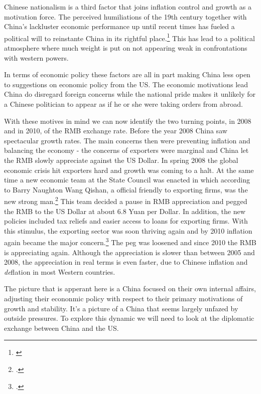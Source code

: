 Chinese nationalism is a third factor that joins inflation control and 
growth as a motivation force. The perceived humiliations of the 19th 
century together with China's lackluster economic performance up until 
recent times has fueled a political will to reinstante China in its 
rightful place.\footnote{\cite{hughes2006}} This has lead to a political 
atmosphere where much weight is put on not appearing weak in 
confrontations with western powers.

In terms of economic policy these factors are all in part making China
less open to suggestions on economic policy from the US. The economic 
motivations lead China do disregard foreign concerns while the national 
pride makes it unlikely for a Chinese politician to appear as if he or 
she were taking orders from abroad.  

With these motives in mind we can now identify the two turning points, 
in 2008 and in 2010, of the RMB exchange rate. Before the year 2008 
China saw spectacular growth rates.  The main concerns then were 
preventing inflation and balancing the economy - the concerns of 
exporters were marginal and China let the RMB slowly appreciate against 
the US Dollar. In spring 2008 the global economic crisis hit exporters 
hard and growth was coming to a halt. At the same time a new economic 
team at the State Council was enacted in which according to Barry 
Naughton Wang Qishan, a official friendly to exporting firms, was the 
new strong man.\footnote{\cite{naughton2008}.} This team decided a pause 
in RMB appreciation and pegged the RMB to the US Dollar at about 6.8 
Yuan per Dollar. In addition, the new policies included tax reliefs and 
easier access to loans for exporting firms. With this stimulus, the 
exporting sector was soon thriving again and by 2010 inflation again 
became the major concern.\footnote{\cite{Naughton2011}.} The peg was 
loosened and since 2010 the RMB is appreciating again. Although the 
appreciation is slower than between 2005 and 2008, the appreciation in 
real terms is even faster, due to Chinese inflation and \emph{de}flation 
in most Western countries.

The picture that is apperant here is a China focused on their own 
internal affairs, adjusting their econonmic policy with respect to their 
primary motivations of growth and stability. It's a picture of a China 
that seems largely unfazed by outside pressures. To explore this dynamic 
we will need to look at the diplomatic exchange between China and the 
US.
